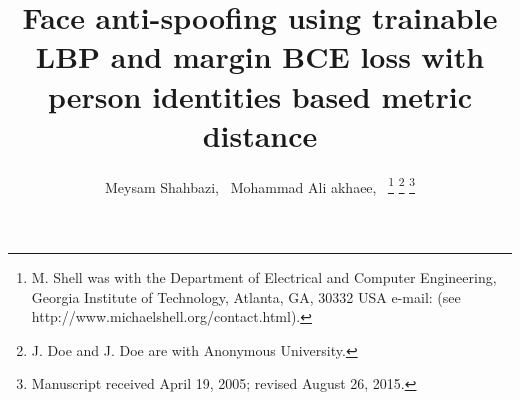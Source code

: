 \documentclass[journal]{IEEEtran}
\begin{document}
%
\title{Face anti-spoofing using trainable LBP and margin BCE loss with person identities based metric distance}


%
%
%

\author{Meysam Shahbazi,~
	Mohammad Ali akhaee,~%
\thanks{M. Shell was with the Department
of Electrical and Computer Engineering, Georgia Institute of Technology, Atlanta,
GA, 30332 USA e-mail: (see http://www.michaelshell.org/contact.html).}%
\thanks{J. Doe and J. Doe are with Anonymous University.}%
\thanks{Manuscript received April 19, 2005; revised August 26, 2015.}}

% 
%
\end{document}
